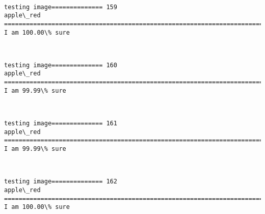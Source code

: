 \documentclass[11pt]{article}
\begin{document}
    \begin{center}
    \end{center}
    { \hspace*{\fill} \\}
    
    \begin{Verbatim}[commandchars=\\\{\}]
testing image============== 159
apple\_red
============================================================================
I am 100.00\% sure

    \end{Verbatim}

    \begin{center}
    \end{center}
    { \hspace*{\fill} \\}
    
    \begin{Verbatim}[commandchars=\\\{\}]
testing image============== 160
apple\_red
============================================================================
I am 99.99\% sure

    \end{Verbatim}

    \begin{center}
    \end{center}
    { \hspace*{\fill} \\}
    
    \begin{Verbatim}[commandchars=\\\{\}]
testing image============== 161
apple\_red
============================================================================
I am 99.99\% sure

    \end{Verbatim}

    \begin{center}
    \end{center}
    { \hspace*{\fill} \\}
    
    \begin{Verbatim}[commandchars=\\\{\}]
testing image============== 162
apple\_red
============================================================================
I am 100.00\% sure

    \end{Verbatim}
\end{document}

